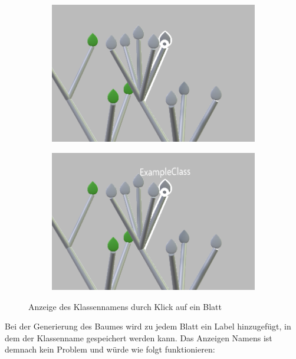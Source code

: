 \setlength{\fwidth}{.49\textwidth}
\begin{figure}[htb]
  \centering
  \begin{subfigure}[b]{\fwidth}
   \includegraphics[width=\textwidth]{figures/leaf-focused}
    \label{fig:leaf-focused}
  \end{subfigure}
  \hfill
  \begin{subfigure}[b]{\fwidth}
  	\includegraphics[width=\textwidth]{figures/leaf-clicked}
  	 \label{fig:leaf-clicked}
  \end{subfigure}
  \caption{Anzeige des Klassennamens durch Klick auf ein Blatt} \label{fig:leaf-interaction}
\end{figure}

Bei der Generierung des Baumes wird zu jedem Blatt ein Label hinzugefügt, in dem der Klassenname gespeichert werden kann. Das Anzeigen Namens ist demnach kein Problem und würde wie folgt funktionieren:


